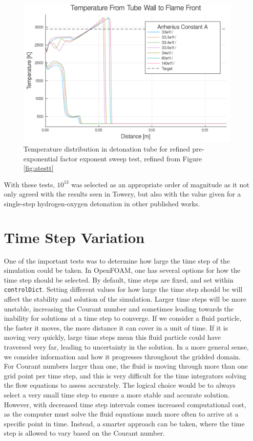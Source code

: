 \begin{figure}
\centering
\includegraphics[width=0.85\linewidth]{./figs/Atest_refined/t.png}
\caption{Temperature distribution in detonation tube for refined pre-exponential factor exponent sweep test, refined from Figure \ref{fig:atestt}}
\label{fig:atestrt}
\end{figure}

With these tests, \(10^{13}\) was selected as an appropriate order of magnitude as it not only agreed with the results seen in Towery\cite{towery1}, but also with the value given for a single-step hydrogen-oxygen detonation in other published works\cite{hashemi}. 




\section{Time Step Variation}
One of the important tests was to determine how large the time step of the simulation could be taken. In OpenFOAM, one has several options for how the time step should be selected. By default, time steps are fixed, and set within \verb|controlDict|. Setting different values for how large the time step should be will affect the stability and solution of the simulation. Larger time steps will be more unstable, increasing the Courant number and sometimes leading towards the inability for solutions at a time step to converge. If we consider a fluid particle, the faster it moves, the more distance it can cover in a unit of time. If it is moving very quickly, large time steps mean this fluid particle could have traversed very far, leading to uncertainty in the solution. In a more general sense, we consider information and how it progresses throughout the gridded domain. For Courant numbers larger than one, the fluid is moving through more than one grid point per time step, and this is very difficult for the time integrators solving the flow equations to assess accurately. The logical choice would be to always select a very small time step to ensure a more stable and accurate solution. However, with decreased time step intervals comes increased computational cost, as the computer must solve the fluid equations much more often to arrive at a specific point in time. Instead, a smarter approach can be taken, where the time step is allowed to vary based on the Courant number. 

